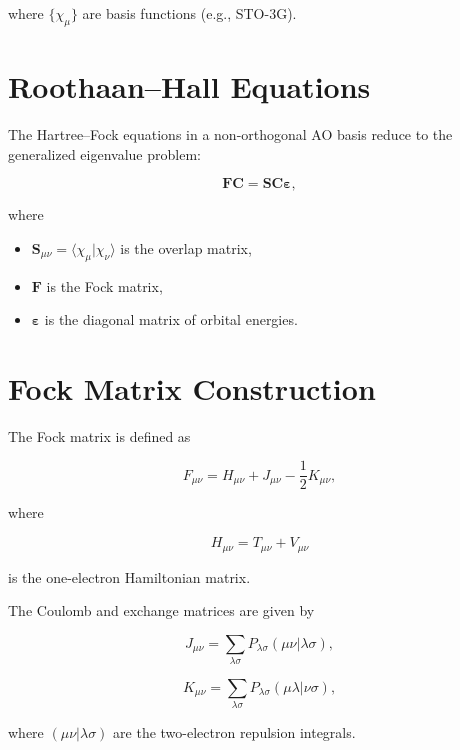 \documentclass[11pt]{article}
\begin{document}
where $\{ \chi_\mu \}$ are basis functions (e.g., STO-3G).

\section{Roothaan--Hall Equations}

The Hartree--Fock equations in a non-orthogonal AO basis reduce to the generalized eigenvalue problem:

\begin{equation}
\mathbf{F} \mathbf{C} = \mathbf{S} \mathbf{C} \bm{\varepsilon},
\end{equation}

where

\begin{itemize}
\item $\mathbf{S}_{\mu\nu} = \langle \chi_\mu | \chi_\nu \rangle$ is the overlap matrix,
\item $\mathbf{F}$ is the Fock matrix,
\item $\bm{\varepsilon}$ is the diagonal matrix of orbital energies.
\end{itemize}

\section{Fock Matrix Construction}

The Fock matrix is defined as

\begin{equation}
F_{\mu\nu} = H_{\mu\nu} + J_{\mu\nu} - \frac{1}{2} K_{\mu\nu},
\end{equation}

where

\begin{equation}
H_{\mu\nu} = T_{\mu\nu} + V_{\mu\nu}
\end{equation}

is the one-electron Hamiltonian matrix.

The Coulomb and exchange matrices are given by

\begin{equation}
J_{\mu\nu} =
\sum_{\lambda\sigma}
P_{\lambda\sigma}
(\mu\nu|\lambda\sigma),
\end{equation}

\begin{equation}
K_{\mu\nu} =
\sum_{\lambda\sigma}
P_{\lambda\sigma}
(\mu\lambda|\nu\sigma),
\end{equation}

where $(\mu\nu|\lambda\sigma)$ are the two-electron repulsion integrals.
\end{document}
